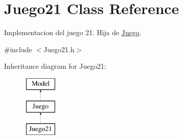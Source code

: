 \hypertarget{class_juego21}{}\section{Juego21 Class Reference}
\label{class_juego21}


Implementacion del juego 21. Hija de \hyperlink{class_juego}{Juego}.  




{\ttfamily \#include $<$Juego21.\+h$>$}

Inheritance diagram for Juego21\+:\begin{figure}[H]
\begin{center}
\leavevmode
\includegraphics[height=3.000000cm]{class_juego21}
\end{center}
\end{figure}
